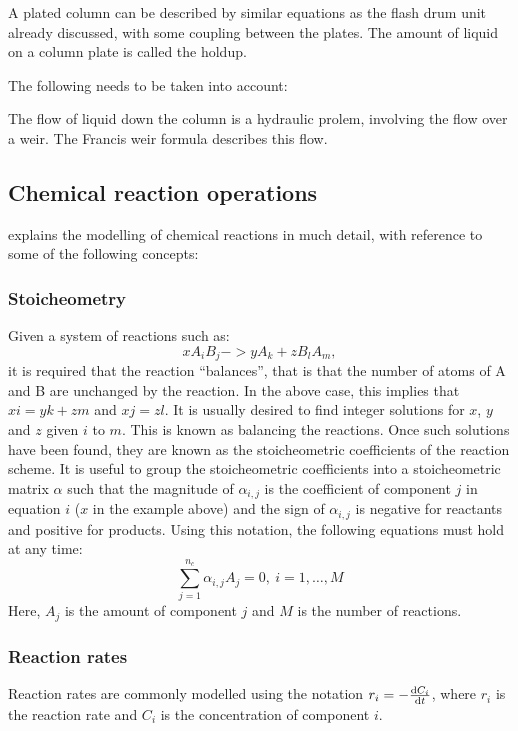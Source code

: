 A plated column can be described by similar equations as the flash
drum unit already discussed, with some coupling between the plates.
The amount of liquid on a column plate is called the holdup.

The following needs to be taken into account:



The flow of liquid down the column is a hydraulic prolem, involving
the flow over a weir.  The Francis weir formula describes this flow.


\subsection{Chemical reaction operations}
\citet[347]{cellier1991continuous} explains the modelling of chemical reactions in much detail, with reference to some of the following concepts:

\subsubsection{Stoicheometry}
Given a system of reactions such as:
\begin{equation}
  xA_iB_j -> yA_k + zB_lA_m,
\end{equation}
it is required that the reaction ``balances'', that is that the number
of atoms of A and B are unchanged by the reaction.  In the above case,
this implies that $xi=yk+zm$ and $xj=zl$.  It is usually desired to
find integer solutions for $x$, $y$ and $z$ given $i$ to $m$.  This is
known as balancing the reactions.  Once such solutions have been
found, they are known as the stoicheometric coefficients of the
reaction scheme.  It is useful to group the stoicheometric
coefficients into a stoicheometric matrix $\alpha$ such that the
magnitude of $\alpha_{i,j}$ is the coefficient of component $j$ in
equation $i$ ($x$ in the example above) and the sign of $\alpha_{i,j}$
is negative for reactants and positive for products.  Using this
notation, the following equations must hold at any time:
\begin{equation}
  \sum_{j=1}^{n_c} \alpha_{i,j}A_j = 0,~i=1,\dots,M
\end{equation}
Here, $A_j$ is the amount of component $j$ and $M$ is the  number
of reactions.

\subsubsection{Reaction rates}
Reaction rates are commonly modelled using the notation
$r_i=-\frac{\mathrm{d} C_i}{\mathrm{d} t}$, where $r_i$ is the reaction rate and $C_i$ is the
concentration of component $i$.  

